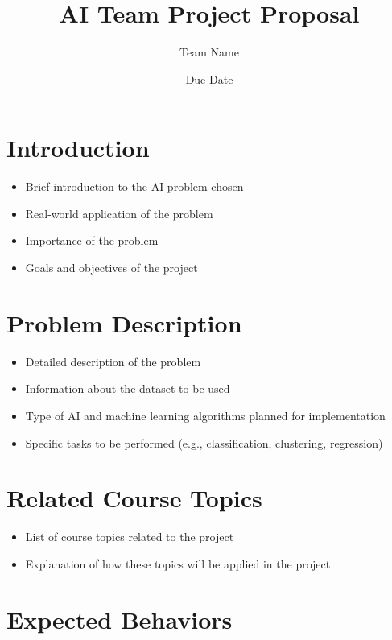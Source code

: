 \documentclass{article}
\title{AI Team Project Proposal}
\author{Team Name}
\date{Due Date}
\begin{document}


\maketitle

\section{Introduction}

\begin{itemize}
    \item Brief introduction to the AI problem chosen
    \item Real-world application of the problem
    \item Importance of the problem
    \item Goals and objectives of the project
\end{itemize}

\section{Problem Description}

\begin{itemize}
    \item Detailed description of the problem
    \item Information about the dataset to be used
    \item Type of AI and machine learning algorithms planned for implementation
    \item Specific tasks to be performed (e.g., classification, clustering,
          regression)
\end{itemize}

\section{Related Course Topics}

\begin{itemize}
    \item List of course topics related to the project
    \item Explanation of how these topics will be applied in the project
\end{itemize}

\section{Expected Behaviors}
\end{document}
